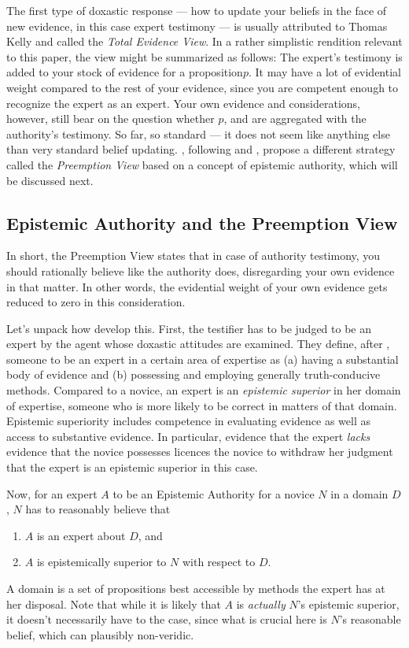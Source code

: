 \documentclass[11pt, a4paper]{scrartcl}
\renewcommand{\i}[1]{\emph{#1}}
\renewcommand{\b}[1]{{\osfamily{}#1}}
\begin{document}
The first type of doxastic response --- how to update your beliefs in the face of new evidence, in this case expert testimony --- is usually attributed to Thomas Kelly \parencite{Kelly2010-KELPDA} and called the \i{Total Evidence View}. In a rather simplistic rendition relevant to this paper, the view might be summarized as follows: The expert's testimony is added to your stock of evidence for a proposition$p$. It may have a lot of evidential weight compared to the rest of your evidence, since you are competent enough to recognize the expert as an expert. Your own evidence and considerations, however, still bear on the question whether $p$, and are aggregated with the authority's testimony. So far, so standard --- it does not seem like anything else than very standard belief updating. \textcite{Constantin2017}, following \textcite{Zagzebski2012-ZAGEAA} and \textcite{Keren2014-KERTAB}, propose a different strategy called the \i{Preemption View} based on a concept of epistemic authority, which will be discussed next.

\subsection{Epistemic Authority and the Preemption View}

In short, the Preemption View states that in case of authority testimony, you should rationally believe like the authority does, disregarding your own evidence in that matter. In other words, the evidential weight of your own evidence gets reduced to zero in this consideration.

Let's unpack how \textcite{Constantin2017} develop this. First, the testifier has to be judged to be an expert by the agent whose doxastic attitudes are examined. They define, after \textcite{Goldman2001}, someone to be an expert in a certain area of expertise as (a) having a substantial body of evidence and (b) possessing and employing generally truth-conducive methods. Compared to a novice, an expert is an \i{epistemic superior} in her domain of expertise, someone who is more likely to be correct in matters of that domain. Epistemic superiority includes competence in evaluating evidence as well as access to substantive evidence. In particular, evidence that the expert \i{lacks} evidence that the novice possesses licences the novice to withdraw her judgment that the expert is an epistemic superior in this case. 

Now, for an expert $A$ to be an \b{Epistemic Authority} for a novice $N$ in a domain $D$, $N$ has to reasonably believe that 
\begin{enumerate}[label = (\roman*)]
    \item $A$ is an expert about $D$, and
    \item $A$ is epistemically superior to $N$ with respect to $D$.
\end{enumerate}
A domain is a set of propositions best accessible by methods the expert has at her disposal. Note that while it is likely that $A$ is \i{actually} $N$'s epistemic superior, it doesn't necessarily have to the case, since what is crucial here is $N$'s reasonable belief, which can plausibly non-veridic. 
\end{document}
